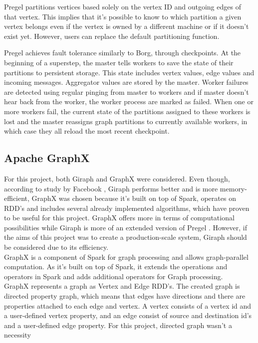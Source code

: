 \documentclass{article}
\theoremstyle{definition}
\begin{document}
Pregel partitions vertices based solely on the vertex ID and outgoing edges of that vertex. This implies that it's possible to know to which partition a given vertex belongs even if the vertex is owned by a different machine or if it doesn't exist yet. However, users can replace the default partitioning function. 

Pregel achieves fault tolerance similarly to Borg, through checkpoints. At the beginning of a superstep, the master tells workers to save the state of their partitions to persistent storage. This state includes vertex values, edge values and incoming messages. Aggregator values are stored by the master. Worker failures are detected using regular pinging from master to workers and if master doesn't hear back from the worker, the worker process are marked as failed. When one or more workers fail, the current state of the partitions assigned to these workers is lost and the master reassigns graph partitions to currently available workers, in which case they all reload the most recent checkpoint. 

\subsection{Apache GraphX}
For this project, both Giraph \cite{giraph} and GraphX \cite{GraphX} were considered. Even though, according to study by Facebook \cite{fbcase}, Giraph performs better and is more memory-efficient, GraphX was chosen because it's built on top of Spark, operates on RDD's and includes several already implemented algorithms, which have proven to be useful for this project. GraphX offers more in terms of computational possibilities while Giraph is more of an extended version of Pregel \cite{Malewicz2010}. However, if the aims of this project was to create a production-scale system, Giraph should be considered due to its efficiency. \\

GraphX is a component of Spark for graph processing and allows graph-parallel computation. As it's built on top of Spark, it extends the operations and operators in Spark and adds additional operators for Graph processing.  \\

GraphX represents a graph as Vertex and Edge RDD's. The created graph is directed property graph, which means that edges have directions and there are properties attached to each edge and vertex.  A vertex consists of a vertex id and a user-defined vertex property, and an edge consist of source and destination id's and a user-defined edge property. For this project, directed graph wasn't a necessity \\
\end{document}
